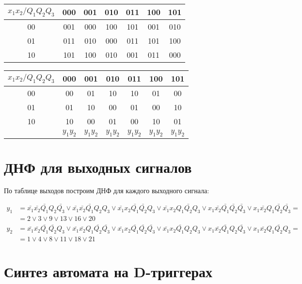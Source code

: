 \documentclass[listings]{labreport}
\begin{document}
\begin{tabular}{|*{7}{c|}}
\hline
$x_1x_2/Q_1Q_2Q_3$ & 000 & 001 & 010 & 011 & 100 & 101\\\hline
00 & 001 & 000 & 100 & 101 & 001 & 010\\\hline
01 & 011 & 010 & 000 & 011 & 101 & 100\\\hline
10 & 101 & 100 & 010 & 001 & 011 & 000\\\hline
\end{tabular}

\begin{tabular}{|*{7}{c|}}
\hline
$x_1x_2/Q_1Q_2Q_3$ & 000 & 001 & 010 & 011 & 100 & 101\\\hline
00 & 00 & 01 & 10 & 10 & 01 & 00\\\hline
01 & 01 & 10 & 00 & 01 & 00 & 10\\\hline
10 & 10 & 00 & 01 & 00 & 10 & 01\\\hline
 & $y_1y_2$ & $y_1y_2$ & $y_1y_2$ & $y_1y_2$ & $y_1y_2$ & $y_1y_2$\\\hline
\end{tabular}

\section*{ДНФ для выходных сигналов}

По таблице выходов построим ДНФ для каждого выходного сигнала:

\begin{align*}
y_1 & = \bar{x_1}\bar{x_2}\bar{Q_1}Q_2\bar{Q_3} \lor \bar{x_1}\bar{x_2}\bar{Q_1}Q_2Q_3 \lor \bar{x_1}x_2\bar{Q_1}\bar{Q_2}Q_3 \lor \bar{x_1}x_2Q_1\bar{Q_2}Q_3 \lor x_1\bar{x_2}\bar{Q_1}\bar{Q_2}\bar{Q_3} \lor x_1\bar{x_2}Q_1\bar{Q_2}\bar{Q_3} = \\ & = 2 \lor 3 \lor 9 \lor 13 \lor 16 \lor 20 \\
y_2 & = \bar{x_1}\bar{x_2}\bar{Q_1}\bar{Q_2}Q_3 \lor \bar{x_1}\bar{x_2}Q_1\bar{Q_2}\bar{Q_3} \lor \bar{x_1}x_2\bar{Q_1}\bar{Q_2}\bar{Q_3} \lor \bar{x_1}x_2\bar{Q_1}Q_2Q_3 \lor x_1\bar{x_2}\bar{Q_1}Q_2\bar{Q_3} \lor x_1\bar{x_2}Q_1\bar{Q_2}Q_3 = \\ & = 1 \lor 4 \lor 8 \lor 11 \lor 18 \lor 21
\end{align*}

\section*{Синтез автомата на D-триггерах}
\end{document}

